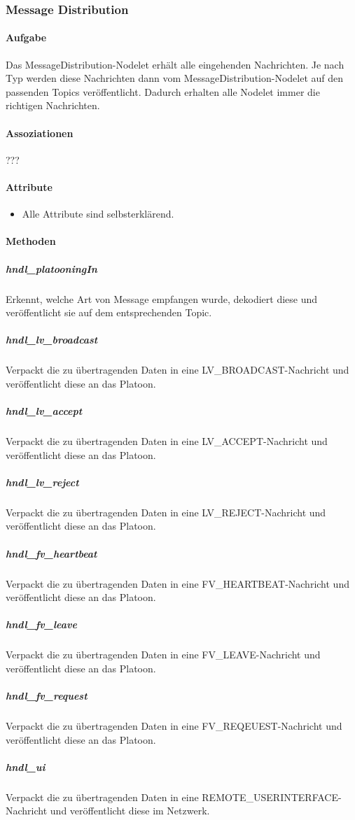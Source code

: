 \documentclass[a4paper, 12pt, titlepage]{scrartcl}
\begin{document}
			\subsubsection{Message Distribution}
			\label{message_distribution}
				\paragraph{Aufgabe} Das MessageDistribution-Nodelet erhält alle eingehenden Nachrichten. Je nach Typ werden diese Nachrichten dann vom MessageDistribution-Nodelet auf den passenden Topics veröffentlicht. Dadurch erhalten alle Nodelet immer die richtigen Nachrichten. 
				\paragraph{Assoziationen} ???
				\paragraph{Attribute}
				    \begin{itemize}
				        \item Alle Attribute sind selbsterklärend. 
				    \end{itemize}
				\paragraph{Methoden}
                    \subparagraph{hndl\_platooningIn} Erkennt, welche Art von Message empfangen wurde, dekodiert diese und veröffentlicht sie auf dem entsprechenden Topic. 
					\subparagraph{hndl\_lv\_broadcast} Verpackt die zu übertragenden Daten in eine LV\_BROADCAST-Nachricht und veröffentlicht diese an das Platoon. 
					\subparagraph{hndl\_lv\_accept} Verpackt die zu übertragenden Daten in eine LV\_ACCEPT-Nachricht und veröffentlicht diese an das Platoon.
					\subparagraph{hndl\_lv\_reject} Verpackt die zu übertragenden Daten in eine LV\_REJECT-Nachricht und veröffentlicht diese an das Platoon.
                	\subparagraph{hndl\_fv\_heartbeat} Verpackt die zu übertragenden Daten in eine FV\_HEARTBEAT-Nachricht und veröffentlicht diese an das Platoon.
                    \subparagraph{hndl\_fv\_leave} Verpackt die zu übertragenden Daten in eine FV\_LEAVE-Nachricht und veröffentlicht diese an das Platoon.
                	\subparagraph{hndl\_fv\_request} Verpackt die zu übertragenden Daten in eine FV\_REQEUEST-Nachricht und veröffentlicht diese an das Platoon.
                	\subparagraph{hndl\_ui} Verpackt die zu übertragenden Daten in eine REMOTE\_USERINTERFACE-Nachricht und veröffentlicht diese im Netzwerk. 
\end{document}

